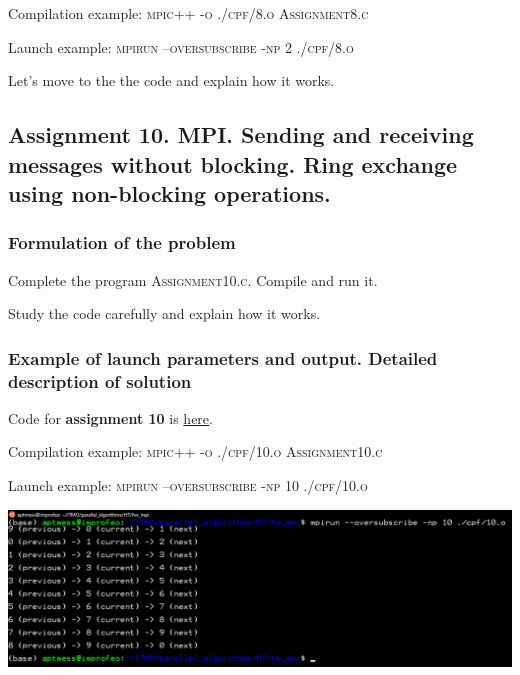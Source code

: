 \documentclass[%
12pt, %
final, %
oneside, %
onecolumn, %
centertags]{article} %
\theoremstyle{plain}
\theoremstyle{definition}
\theoremstyle{remark}
\begin{document}
Compilation example: \textsc{mpic++ -o ./cpf/8.o Assignment8.c}

Launch example: \textsc{mpirun --oversubscribe -np 2 ./cpf/8.o}


Let's move to the the code and explain how it works.



\newpage
\subsection{Assignment 10. MPI. Sending and receiving messages without blocking. Ring exchange using non-blocking operations.}

\subsubsection{Formulation of the problem}

Complete the program \textsc{Assignment10.c.} Compile and run it.

Study the code carefully and explain how it works.

\subsubsection{Example of launch parameters and output. Detailed description of solution}

Code for \textbf{assignment 10} is \href{https:\//github.com/aptmess/parallel_algorithms/blob/master/HT/hw_mpi/Assignment10.c}{here}.

Compilation example: \textsc{mpic++ -o ./cpf/10.o Assignment10.c}

Launch example: \textsc{mpirun --oversubscribe -np 10 ./cpf/10.o}

\begin{center}
\includegraphics[scale=0.5]{10.png}
\end{center}
\end{document}
